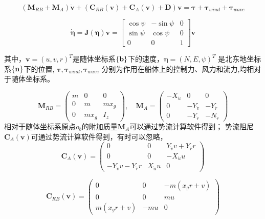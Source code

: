 \begin{equation}
  \label{eq:3dofmaneuvering}
  (\bm{M}_{RB}+\bm{M}_A) \dot{\bm{v}}+(\bm{C}_{RB}(\bm{v})+
  \bm{C}_{A}(\bm{v})+\bm{D})\bm{v}=\bm{\tau}+\bm{\tau}_{wind}+
  \bm{\tau}_{wave}
\end{equation}

\begin{equation}
  \label{eq:3doftransform}
  \dot{\bm{\eta}}=\bm{J}(\bm{\eta})\bm{v}=
  \begin{bmatrix}
    \cos{\psi} & -\sin{\psi} & 0 \\
    \sin{\psi} & \cos{\psi} & 0 \\
    0 & 0 & 1
  \end{bmatrix}
  \bm{v}
\end{equation}

其中，$\bm{v}=(u,v,r)^T$是随体坐标系$\left\{ \mathbf{b} \right\}$下的速度，$\bm{\eta}=(N,E,\psi)^T$
是北东地坐标系$\left\{ \mathbf{n} \right\}$下的位置, $\bm{\tau},\bm{\tau}_{wind}, \bm{\tau}_{wave}$
分别为作用在船体上的控制力、风力和流力,均相对于随体坐标系。

\begin{equation}
  \label{eq:massmatrix}
  \bm{M}_{RB}=\begin{pmatrix}
            m & 0 & 0 \\
            0 & m & mx_g \\
            0 & mx_g & I_z
          \end{pmatrix},
  \quad
  \bm{M}_{A}=\begin{pmatrix}
            -X_{\dot{u}} & 0 & 0 \\
            0 & -Y_{\dot{v}} & -Y_{\dot{r}} \\
            0 & -Y_{\dot{r}} & -N_{\dot{r}}
          \end{pmatrix}
\end{equation}
相对于随体坐标系原点$o_b$的附加质量$\bm{M}_{A}$可以通过势流计算软件得到；
势流阻尼$\bm{C}_{A}(\bm{v})$可通过势流计算软件得到，有时可以忽略，
\begin{equation}
  \label{eq:potentialdampingmatrix}
  \bm{C}_{A}(\bm{v})=
          \begin{pmatrix}
            0 & 0 &  Y_{\dot{v}}v+Y_{\dot{r}}r \\
            0 & 0 & -X_{\dot{u}}u \\
            -Y_{\dot{v}}v-Y_{\dot{r}}r & X_{\dot{u}}u & 0
          \end{pmatrix}
\end{equation}

\begin{equation}
  \label{eq:coupleddampingmatrix}
  \bm{C}_{RB}(\bm{v})=
         \begin{pmatrix}
            0 & 0 & -m(x_g r +v) \\
            0 & 0 & mu \\
            m(x_g r +v) & -mu & 0
          \end{pmatrix}
\end{equation}

